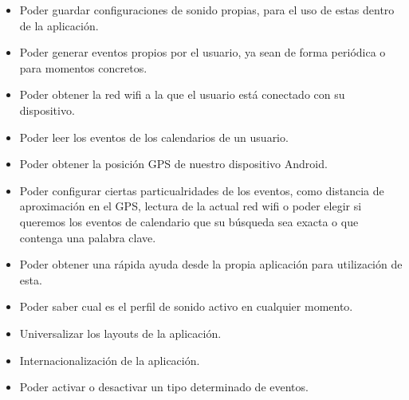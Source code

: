 \begin{itemize}
	\item Poder guardar configuraciones de sonido propias, para el uso de estas dentro de la aplicación.
	\item Poder generar eventos propios por el usuario, ya sean de forma periódica o para momentos concretos.
	\item Poder obtener la red wifi a la que el usuario está conectado con su dispositivo.
	\item Poder leer los eventos de los calendarios de un usuario.
	\item Poder obtener la posición GPS de nuestro dispositivo Android.
	\item Poder configurar ciertas particualridades de los eventos, como distancia de aproximación en el GPS, lectura de la actual red wifi o poder elegir si queremos los eventos de calendario que su búsqueda sea exacta o que contenga una palabra clave.
	\item Poder obtener una rápida ayuda desde la propia aplicación para utilización de esta.
	\item Poder saber cual es el perfil de sonido activo en cualquier momento.
	\item Universalizar los layouts de la aplicación.
	\item Internacionalización de la aplicación.
	\item Poder activar o desactivar un tipo determinado de eventos.
\end{itemize}